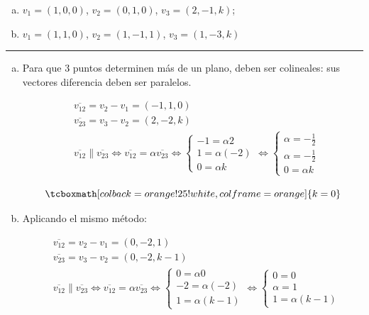 \documentclass{article}
\begin{document}
\begin{enumerate}[(a)]
\bfseries
\item $v_1 = (1, 0, 0)$, $v_2=(0, 1, 0)$, $v_3 = (2, -1, k)$;

\item $v_1 = (1, 1, 0)$, $v_2=(1, -1, 1)$, $v_3 = (1, -3, k)$
\end{enumerate}
\hrule

\begin{enumerate}[(a)]

\item Para que 3 puntos determinen más de un plano, deben ser colineales: sus vectores diferencia deben ser paralelos.

\begin{subequations}
\begin{align}
& \overline{v_{12}} = v_2 - v_1 = (-1, 1, 0) \\
& \overline{v_{23}} = v_3 - v_2 = (2, -2, k) \\
& \overline{v_{12}} \parallel \overline{v_{23}} \Leftrightarrow \overline{v_{12}} = \alpha \overline{v_{23}} \Leftrightarrow \left\{ \begin{array}{ll}
-1 = \alpha 2 \\
1 = \alpha (-2) \\
0 = \alpha k
\end{array} \right. \Leftrightarrow \left\{ \begin{array}{ll}
\alpha = -\frac{1}{2} \\
\alpha = -\frac{1}{2} \\
0 = \alpha k
\end{array} \right.
\end{align}
\end{subequations}

\begin{equation}
\tcboxmath[colback=orange!25!white,colframe=orange]
{ k = 0 }
\end{equation}

\item Aplicando el mismo método:

\begin{subequations}
\begin{align}
& \overline{v_{12}} = v_2 - v_1 = (0, -2, 1) \\
& \overline{v_{23}} = v_3 - v_2 = (0, -2, k-1) \\
& \overline{v_{12}} \parallel \overline{v_{23}} \Leftrightarrow \overline{v_{12}} = \alpha \overline{v_{23}} \Leftrightarrow \left\{ \begin{array}{ll}
0 = \alpha 0 \\
-2 = \alpha (-2) \\
1 = \alpha (k-1)
\end{array} \right. \Leftrightarrow \left\{ \begin{array}{ll}
0 = 0 \\
\alpha = 1 \\
1 = \alpha (k-1)
\end{array} \right.
\end{align}
\end{subequations}


\end{enumerate}
\end{document}
